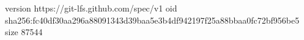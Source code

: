 version https://git-lfs.github.com/spec/v1
oid sha256:fc40df30aa296a88091343d39baa5e3b4df942197f25a88bbaa0fc72bf956be5
size 87544
